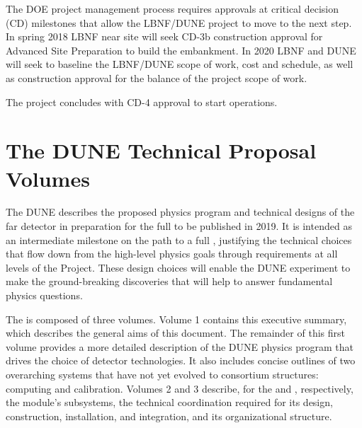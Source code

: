 The DOE project management process requires approvals at critical decision (CD) milestones that allow the LBNF/DUNE project to move to the next step. In spring 2018 LBNF near site  will seek CD-3b construction approval for Advanced Site Preparation to build the embankment. In 2020 LBNF and DUNE will seek to baseline the LBNF/DUNE scope of work, cost and schedule, as well as construction approval for the balance of the project scope of work. 

The project concludes with CD-4 approval to start operations.


\section{The DUNE Technical Proposal Volumes}


The DUNE  describes the proposed physics program and 
technical designs of the far detector in preparation for the full  
to be published in 2019.  
It is intended as an intermediate
milestone on the path to a full , justifying the technical choices that flow down from the high-level physics goals through requirements at all levels of the Project. These design choices will enable the DUNE experiment to make the ground-breaking discoveries that will help to  answer %
fundamental physics questions.

The   is composed of three volumes. Volume 1 contains this executive summary, which describes 
the general aims of this document. The remainder of this first volume provides a more detailed description of the DUNE physics program that drives the choice of detector technologies. It also includes concise outlines of two overarching systems that have not yet evolved to consortium structures:  computing and calibration. 
Volumes 2  and 3 describe, for the \single and \dual, %
respectively, the module's subsystems, the technical coordination required for its design, construction, installation, and integration, and its organizational structure.



